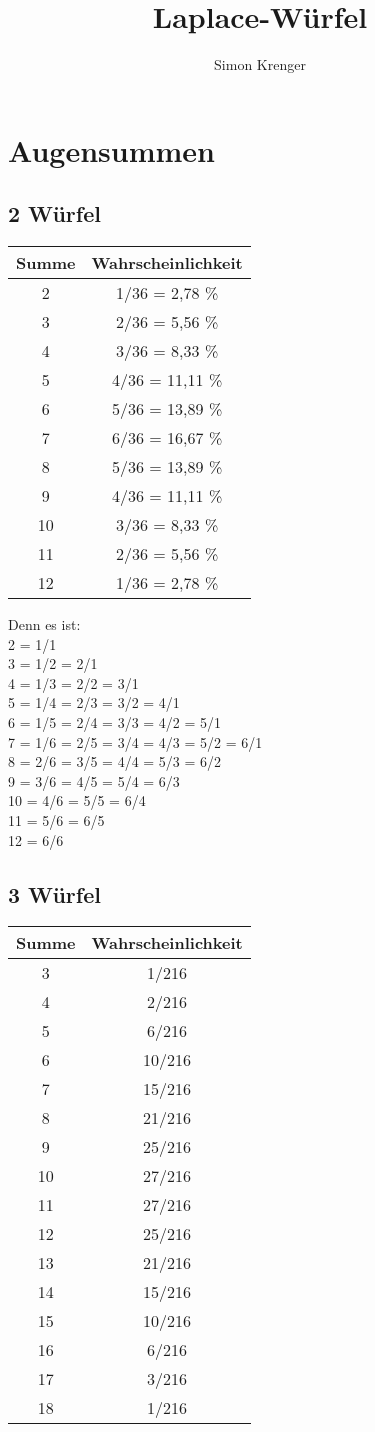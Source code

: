 \documentclass{article}
\title{Laplace-Würfel}
\author{Simon Krenger}
\begin{document}
\section{Augensummen}
\subsection{2 Würfel}
\begin{tabular}{c | c}
Summe & Wahrscheinlichkeit \\
\hline
2 & 1/36 = 2,78 \% \\
3 & 2/36 = 5,56 \%\\
4 & 3/36 = 8,33 \%\\
5 & 4/36 = 11,11 \%\\
6 & 5/36 = 13,89 \%\\
7 & 6/36 = 16,67 \%\\
8 & 5/36 = 13,89 \%\\
9 & 4/36 = 11,11 \%\\
10 & 3/36 = 8,33 \%\\
11 & 2/36 = 5,56 \%\\
12 & 1/36 = 2,78 \%
\end{tabular}

Denn es ist:\\
2 = 1/1\\
3 = 1/2 = 2/1\\
4 = 1/3 = 2/2 = 3/1\\
5 = 1/4 = 2/3 = 3/2 = 4/1\\
6 = 1/5 = 2/4 = 3/3 = 4/2 = 5/1\\
7 = 1/6 = 2/5 = 3/4 = 4/3 = 5/2 = 6/1\\
8 = 2/6 = 3/5 = 4/4 = 5/3 = 6/2\\
9 = 3/6 = 4/5 = 5/4 = 6/3\\
10 = 4/6 = 5/5 = 6/4\\
11 = 5/6 = 6/5\\
12 = 6/6
\pagebreak
\subsection{3 Würfel}

\begin{tabular}{c | c}
Summe & Wahrscheinlichkeit \\
\hline
3 & 1/216\\
4 & 2/216\\
5 & 6/216\\
6 & 10/216\\
7 & 15/216\\
8 & 21/216\\
9 & 25/216\\
10 & 27/216\\
11 & 27/216\\
12 & 25/216\\
13 & 21/216\\
14 & 15/216\\
15 & 10/216\\
16 & 6/216\\
17 & 3/216\\
18 & 1/216\\
\end{tabular}
\end{document}
